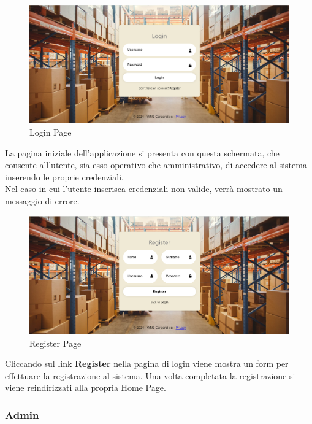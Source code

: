 \begin{figure}[H]
    \centering
    \includegraphics[width=\textwidth]{document/sections/img/Storyboard/login.png}
    \caption{Login Page}
    \label{fig:loginPage}
\end{figure}

La pagina iniziale dell’applicazione si presenta con questa schermata, che consente all’utente, sia esso operativo che
amministrativo, di accedere al sistema inserendo le proprie credenziali.\\
Nel caso in cui l’utente inserisca credenziali non valide, verrà mostrato un messaggio di errore.

\begin{figure}[H]
    \centering
    \includegraphics[width=\textwidth]{document/sections/img/Storyboard/register.png}
    \caption{Register Page}
    \label{fig:registerPage}
\end{figure}

Cliccando sul link \textbf{Register} nella pagina di login viene mostra un form per effettuare la registrazione al sistema.
Una volta completata la registrazione si viene reindirizzati alla propria Home Page.

\subsubsection{Admin}

